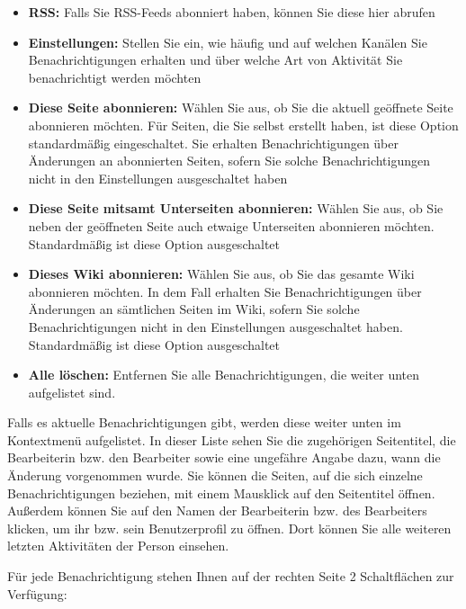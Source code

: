 \documentclass[
  letterpaper,
  DIV=11,
  numbers=noendperiod]{scrreprt}
\providecommand{\tightlist}{%
  \setlength{\itemsep}{0pt}\setlength{\parskip}{0pt}}\usepackage{longtable,booktabs,array}
\begin{document}
\begin{itemize}
\tightlist
\item
  \textbf{RSS:} Falls Sie RSS-Feeds abonniert haben, können Sie diese
  hier abrufen
\item
  \textbf{Einstellungen:} Stellen Sie ein, wie häufig und auf welchen
  Kanälen Sie Benachrichtigungen erhalten und über welche Art von
  Aktivität Sie benachrichtigt werden möchten
\item
  \textbf{Diese Seite abonnieren:} Wählen Sie aus, ob Sie die aktuell
  geöffnete Seite abonnieren möchten. Für Seiten, die Sie selbst
  erstellt haben, ist diese Option standardmäßig eingeschaltet. Sie
  erhalten Benachrichtigungen über Änderungen an abonnierten Seiten,
  sofern Sie solche Benachrichtigungen nicht in den Einstellungen
  ausgeschaltet haben
\item
  \textbf{Diese Seite mitsamt Unterseiten abonnieren:} Wählen Sie aus,
  ob Sie neben der geöffneten Seite auch etwaige Unterseiten abonnieren
  möchten. Standardmäßig ist diese Option ausgeschaltet
\item
  \textbf{Dieses Wiki abonnieren:} Wählen Sie aus, ob Sie das gesamte
  Wiki abonnieren möchten. In dem Fall erhalten Sie Benachrichtigungen
  über Änderungen an sämtlichen Seiten im Wiki, sofern Sie solche
  Benachrichtigungen nicht in den Einstellungen ausgeschaltet haben.
  Standardmäßig ist diese Option ausgeschaltet
\item
  \textbf{Alle löschen:} Entfernen Sie alle Benachrichtigungen, die
  weiter unten aufgelistet sind.
\end{itemize}

Falls es aktuelle Benachrichtigungen gibt, werden diese weiter unten im
Kontextmenü aufgelistet. In dieser Liste sehen Sie die zugehörigen
Seitentitel, die Bearbeiterin bzw. den Bearbeiter sowie eine ungefähre
Angabe dazu, wann die Änderung vorgenommen wurde. Sie können die Seiten,
auf die sich einzelne Benachrichtigungen beziehen, mit einem Mausklick
auf den Seitentitel öffnen. Außerdem können Sie auf den Namen der
Bearbeiterin bzw. des Bearbeiters klicken, um ihr bzw. sein
Benutzerprofil zu öffnen. Dort können Sie alle weiteren letzten
Aktivitäten der Person einsehen.

Für jede Benachrichtigung stehen Ihnen auf der rechten Seite 2
Schaltflächen zur Verfügung:
\end{document}

